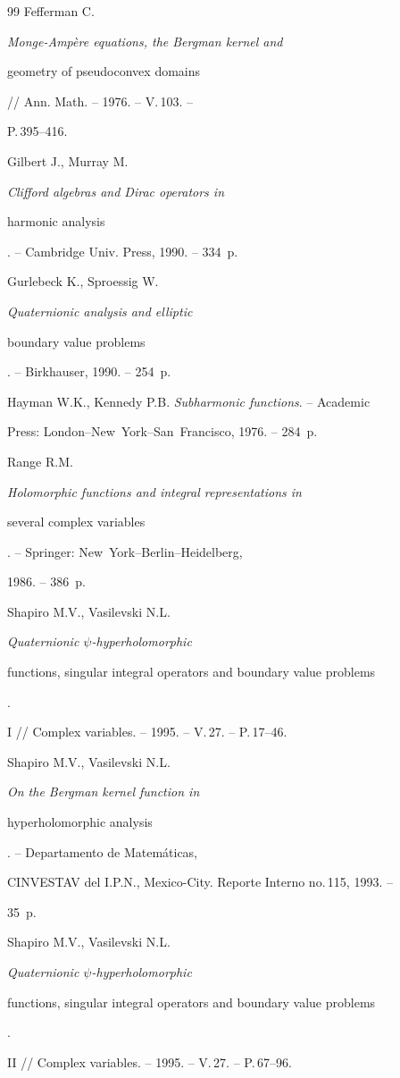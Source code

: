 \begin{thebibliography}{99}
Fefferman C. {\em Monge-Amp\`{e}re equations, the Bergman kernel and 


geometry of pseudoconvex domains} // Ann. Math. -- 1976. -- V.\,103. -- 


P.\,395--416. 




Gilbert J., Murray M. {\em Clifford algebras and Dirac operators in 


harmonic analysis}. -- Cambridge Univ. Press, 1990. -- 334~p.




Gurlebeck K., Sproessig W. {\em Quaternionic analysis and elliptic 


boundary value problems}. -- Birkhauser, 1990. -- 254~p.




Hayman W.K., Kennedy P.B. {\em Subharmonic functions}. -- Academic 


Press: London--New~York--San~Francisco, 1976. -- 284~p.




Range R.M. {\em Holomorphic functions and integral representations in 


several complex variables}. -- Springer: New~York--Berlin--Heidelberg, 


1986. -- 386~p.




Shapiro M.V., Vasilevski N.L. {\em Quaternionic $\psi$-hyperholomorphic 


functions, singular integral operators and boundary value problems}. 


I // Complex variables. -- 1995. -- V.\,27. -- P.\,17--46.




Shapiro M.V., Vasilevski N.L. {\em On the Bergman kernel function in 


hyperholomorphic analysis}. -- Departamento de Matem\'{a}ticas, 


CINVESTAV del I.P.N., Mexico-City. Reporte Interno no.\,115, 1993. -- 


35~p. 




Shapiro M.V., Vasilevski N.L. {\em Quaternionic $\psi$-hyperholomorphic 


functions, singular integral operators and boundary value problems}. 


II // Complex variables. -- 1995. -- V.\,27. -- P.\,67--96. 








\end{thebibliography} 


 


\vskip 0.5cm 


 










 


 


